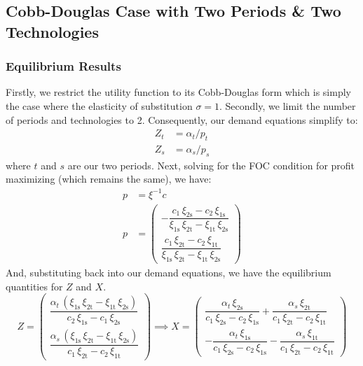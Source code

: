 \documentclass[12pt,a4paper]{extarticle}
\begin{document}
\subsection{Cobb-Douglas Case with Two Periods \& Two Technologies}

\subsubsection{Equilibrium Results}

Firstly, we restrict the utility function to its Cobb-Douglas form which is simply the case where the elasticity of substitution $\sigma = 1$. Secondly, we limit the number of periods and technologies to 2. Consequently, our demand equations simplify to:
\begin{align}
Z_t &= \alpha_t / p_t \\
Z_s &= \alpha_s / p_s
\end{align}
where $t$ and $s$ are our two periods. Next, solving for the FOC condition for profit maximizing (which remains the same), we have:
\begin{align*}
p &=  \xi^{-1} c \\
p &= \begin{pmatrix}
-\dfrac{c_{1}\,\xi _{\mathrm{2s}}-c_{2}\,\xi _{\mathrm{1s}}}{\xi _{\mathrm{1s}}\,\xi _{\mathrm{2t}}-\xi _{\mathrm{1t}}\,\xi _{\mathrm{2s}}}  \\[2ex]
\dfrac{c_{1}\,\xi _{\mathrm{2t}}-c_{2}\,\xi _{\mathrm{1t}}}{\xi _{\mathrm{1s}}\,\xi _{\mathrm{2t}}-\xi _{\mathrm{1t}}\,\xi _{\mathrm{2s}}} 
\end{pmatrix} 
\end{align*}
And, substituting back into our demand equations, we have the equilibrium quantities for $Z$ and $X$. 
$$
Z = \begin{pmatrix}
\dfrac{\alpha _{t}\,\left(\xi _{\mathrm{1s}}\,\xi _{\mathrm{2t}}-\xi _{\mathrm{1t}}\,\xi _{\mathrm{2s}}\right)}{c_{2}\,\xi _{\mathrm{1s}} - c_{1}\,\xi _{\mathrm{2s}}} \\[2ex]
\dfrac{\alpha _{s}\,\left(\xi _{\mathrm{1s}}\,\xi _{\mathrm{2t}}-\xi _{\mathrm{1t}}\,\xi _{\mathrm{2s}}\right)}{c_{1}\,\xi _{\mathrm{2t}}-c_{2}\,\xi _{\mathrm{1t}}} 
\end{pmatrix}
\implies 
X = \begin{pmatrix}
\dfrac{\alpha _{t}\,\xi _{\mathrm{2s}}}{c_{1}\,\xi _{\mathrm{2s}}-c_{2}\,\xi _{\mathrm{1s}}}+\dfrac{\alpha _{s}\,\xi _{\mathrm{2t}}}{c_{1}\,\xi _{\mathrm{2t}}-c_{2}\,\xi _{\mathrm{1t}}} \\[2ex] 
-\dfrac{\alpha _{t}\,\xi _{\mathrm{1s}}}{c_{1}\,\xi _{\mathrm{2s}}-c_{2}\,\xi _{\mathrm{1s}}}-\dfrac{\alpha _{s}\,\xi _{\mathrm{1t}}}{c_{1}\,\xi _{\mathrm{2t}}-c_{2}\,\xi _{\mathrm{1t}}}
\end{pmatrix}
$$
\end{document}
